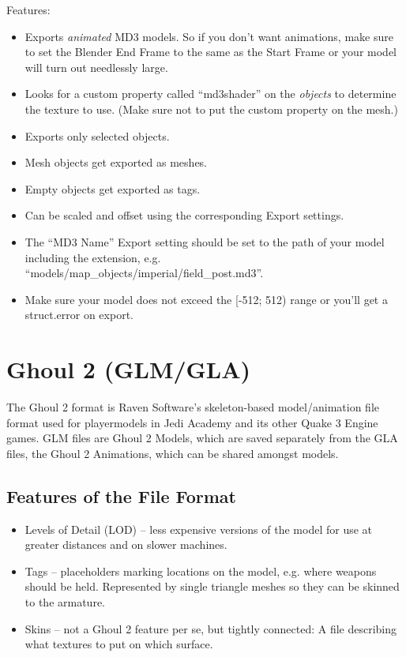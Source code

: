 \documentclass[a4paper,10pt]{article}
\begin{document}
 Features:
 \begin{itemize}
  \item Exports \emph{animated} MD3 models. So if you don't want animations, make sure to set the Blender
  End Frame to the same as the Start Frame or your model will turn out needlessly large.
  \item Looks for a custom property called ``md3shader'' on the \emph{objects} to determine the texture to use.
  (Make sure not to put the custom property on the mesh.) 
  \item Exports only selected objects.
  \item Mesh objects get exported as meshes.
  \item Empty objects get exported as tags.
  \item Can be scaled and offset using the corresponding Export settings.
  \item The ``MD3 Name'' Export setting should be set to the path of your model including the extension, e.g.\\
  ``models/map\_objects/imperial/field\_post.md3''.
  \item Make sure your model does not exceed the [-512; 512) range or you'll get a struct.error on export.
 \end{itemize}

 
 \section{Ghoul 2 (GLM/GLA)}
 
 The Ghoul 2 format is Raven Software's skeleton-based model/animation file format used for playermodels in
 Jedi Academy and its other Quake 3 Engine games. GLM files are Ghoul 2 Models, which are saved separately from
 the GLA files, the Ghoul 2 Animations, which can be shared amongst models.
 
 
 \subsection{Features of the File Format}
 \begin{itemize}
  \item Levels of Detail (LOD) -- less expensive versions of the model for use at greater distances and on
  slower machines.
  \item Tags -- placeholders marking locations on the model, e.g. where weapons should be held. Represented by
  single triangle meshes so they can be skinned to the armature.
  \item Skins -- not a Ghoul 2 feature per se, but tightly connected: A file describing what textures to put on
  which surface.
 \end{itemize}
 
\end{document}
